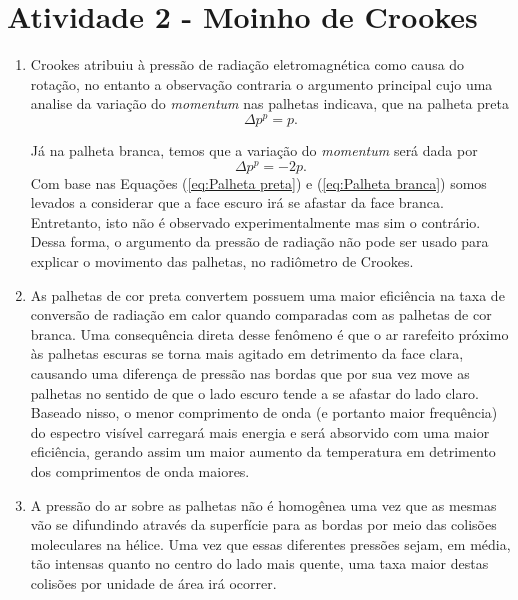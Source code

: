 \documentclass[12pt,a4paper]{article}
\begin{document}
\section*{Atividade 2 - Moinho de Crookes}
\begin{enumerate}
    
    \item Crookes atribuiu à pressão de radiação eletromagnética como causa do rotação, no entanto a observação contraria o argumento principal cujo uma analise da variação do \textit{momentum} nas palhetas indicava, que na palheta preta
    \begin{equation} \label{eq:Palheta preta}
        \Delta p^p=p.
    \end{equation}
    
    Já na palheta branca, temos que a variação do \textit{momentum} será dada por
    \begin{equation} \label{eq:Palheta branca}
        \Delta p^p=-2p.
    \end{equation}
    Com base nas Equações (\ref{eq:Palheta preta}) e (\ref{eq:Palheta branca}) somos levados a considerar que a face escuro irá se afastar da face branca. Entretanto, isto não é observado experimentalmente mas sim o contrário. Dessa forma, o argumento da pressão de radiação não pode ser usado para explicar o movimento das palhetas, no radiômetro de Crookes.


    \item As palhetas de cor preta convertem possuem uma maior eficiência na taxa de conversão de radiação em calor quando comparadas com as palhetas de cor branca. Uma consequência direta desse fenômeno é que o ar rarefeito próximo às palhetas escuras se torna mais agitado em detrimento da face clara, causando uma diferença de pressão nas bordas que por sua vez move as palhetas no sentido de que o lado escuro tende a se afastar do lado claro. Baseado nisso, o menor comprimento de onda (e portanto maior frequência) do espectro visível carregará mais energia e será absorvido com uma maior eficiência, gerando assim um maior aumento da temperatura em detrimento dos comprimentos de onda maiores.
    



    \item A pressão do ar sobre as palhetas não é homogênea uma vez que as mesmas vão se difundindo através da superfície para as bordas por meio das colisões moleculares na hélice. Uma vez que essas diferentes pressões sejam, em média, tão intensas quanto no centro do lado mais quente, uma taxa maior destas colisões por unidade de área irá ocorrer. 




\end{enumerate}
\end{document}
